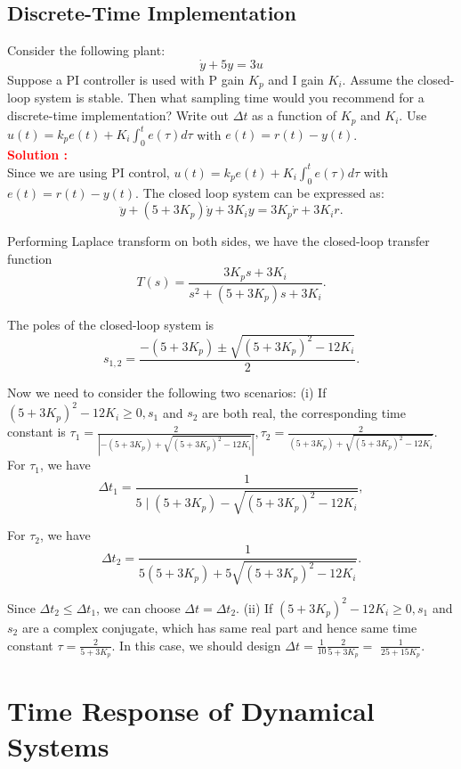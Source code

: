 \documentclass[12pt]{article}
\begin{document}
\subsection{Discrete-Time Implementation}
Consider the following plant:
$$
\dot{y}+5 y=3 u
$$
Suppose a PI controller is used with P gain $K_p$ and I gain $K_i$. Assume the closed-loop system is stable. Then what sampling time would you recommend for a discrete-time implementation? Write out $\Delta t$ as a function of $K_p$ and $K_i$. Use $u(t)=k_p e(t)+K_i \int_0^t e(\tau) d \tau$ with $e(t)=r(t)-y(t)$. \\

\textbf{\textcolor{red}{Solution :}} \\
Since we are using PI control, $u(t)=k_p e(t)+K_i \int_0^t e(\tau) d \tau$ with $e(t)=r(t)-y(t)$. The closed loop system can be expressed as:
$$ \ddot{y}+\left(5+3 K_p\right) \dot{y}+3 K_i y=3 K_p \dot{r}+3 K_i r . $$

\noindent Performing Laplace transform on both sides, we have the closed-loop transfer function
$$
T(s)=\frac{3 K_p s+3 K_i}{s^2+\left(5+3 K_p\right) s+3 K_i} .
$$

\noindent The poles of the closed-loop system is
$$
s_{1,2}=\frac{-\left(5+3 K_p\right) \pm \sqrt{\left(5+3 K_p\right)^2-12 K_i}}{2} .
$$

\noindent Now we need to consider the following two scenarios:
(i) If $\left(5+3 K_p\right)^2-12 K_i \geq 0, s_1$ and $s_2$ are both real, the corresponding time constant is $\tau_1=\frac{2}{\left|-\left(5+3 K_p\right)+\sqrt{\left(5+3 K_p\right)^2-12 K_i}\right|}, \tau_2=\frac{2}{\left(5+3 K_p\right)+\sqrt{\left(5+3 K_p\right)^2-12 K_i}}$. For $\tau_1$, we have
$$
\Delta t_1=\frac{1}{5 \mid\left(5+3 K_p\right)-\sqrt{\left(5+3 K_p\right)^2-12 K_i}},
$$

For $\tau_2$, we have
$$
\Delta t_2=\frac{1}{5\left(5+3 K_p\right)+5 \sqrt{\left(5+3 K_p\right)^2-12 K_i}} .
$$

\noindent Since $\Delta t_2 \leq \Delta t_1$, we can choose $\Delta t=\Delta t_2$.
(ii) If $\left(5+3 K_p\right)^2-12 K_i \geq 0, s_1$ and $s_2$ are a complex conjugate, which has same real part and hence same time constant $\tau=\frac{2}{5+3 K_p}$. In this case, we should design $\Delta t=\frac{1}{10} \frac{2}{5+3 K_p}=$ $\frac{1}{25+15 K_p}$.
\clearpage

\section{Time Response of Dynamical Systems}
\end{document}
